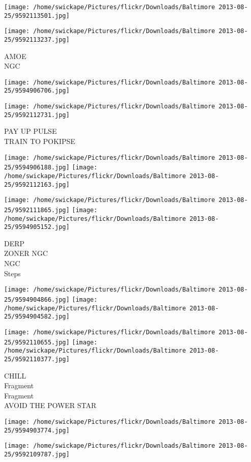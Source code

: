 \documentclass[10pt,letterpaper]{article}
\begin{document}
\texttt{[image: /home/swickape/Pictures/flickr/Downloads/Baltimore 2013-08-25/9592113501.jpg]}

\vspace{0.25in}
\texttt{[image: /home/swickape/Pictures/flickr/Downloads/Baltimore 2013-08-25/9592113237.jpg]}

AMOE\\
NGC
\pagebreak

\texttt{[image: /home/swickape/Pictures/flickr/Downloads/Baltimore 2013-08-25/9594906706.jpg]}

\vspace{0.25in}
\texttt{[image: /home/swickape/Pictures/flickr/Downloads/Baltimore 2013-08-25/9592112731.jpg]}

PAY UP PULSE\\
TRAIN TO POKIPSE
\pagebreak

\texttt{[image: /home/swickape/Pictures/flickr/Downloads/Baltimore 2013-08-25/9594906188.jpg]}
\texttt{[image: /home/swickape/Pictures/flickr/Downloads/Baltimore 2013-08-25/9592112163.jpg]}

\texttt{[image: /home/swickape/Pictures/flickr/Downloads/Baltimore 2013-08-25/9592111865.jpg]}
\texttt{[image: /home/swickape/Pictures/flickr/Downloads/Baltimore 2013-08-25/9594905152.jpg]}

DERP\\
ZONER NGC\\
NGC\\
Steps
\pagebreak

\texttt{[image: /home/swickape/Pictures/flickr/Downloads/Baltimore 2013-08-25/9594904866.jpg]}
\texttt{[image: /home/swickape/Pictures/flickr/Downloads/Baltimore 2013-08-25/9594904582.jpg]}

\texttt{[image: /home/swickape/Pictures/flickr/Downloads/Baltimore 2013-08-25/9592110655.jpg]}
\texttt{[image: /home/swickape/Pictures/flickr/Downloads/Baltimore 2013-08-25/9592110377.jpg]}

CHILL\\
Fragment\\
Fragment\\
AVOID THE POWER STAR
\pagebreak

\texttt{[image: /home/swickape/Pictures/flickr/Downloads/Baltimore 2013-08-25/9594903774.jpg]}

\vspace{0.25in}
\texttt{[image: /home/swickape/Pictures/flickr/Downloads/Baltimore 2013-08-25/9592109787.jpg]}
\end{document}
